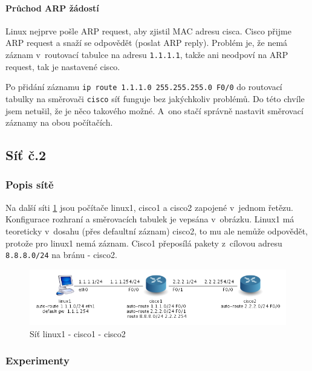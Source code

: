 \paragraph{Průchod ARP žádostí}
Linux nejprve pošle ARP request, aby zjistil MAC adresu cisca. Cisco přijme ARP request a snaží se odpovědět (poslat ARP reply). Problém je, že nemá záznam v~routovací tabulce na adresu \verb|1.1.1.1|, takže ani neodpoví na ARP request, tak  je nastavené cisco.

Po přidání záznamu \verb|ip route 1.1.1.0 255.255.255.0 F0/0| do routovací tabulky na směrovači \verb|cisco| síť funguje bez jakýchkoliv problémů. Do této chvíle jsem netušil, že je něco takového možné. A~ono stačí správně nastavit směrovací záznamy na obou počítačích.


\subsection{Síť č.2}
\subsubsection{Popis sítě}
Na další síti \ref{fig:sit_3pc} jsou počítače linux1, cisco1 a cisco2 zapojené v~jednom řetězu. Konfigurace rozhraní a směrovacích tabulek je vepsána v~obrázku. Linux1 má teoreticky v~dosahu (přes defaultní záznam) cisco2, to mu ale nemůže odpovědět, protože pro linux1 nemá záznam. Cisco1 přeposílá pakety z~cílovou adresu \verb|8.8.8.0/24| na bránu - cisco2.

\begin{figure}[h]
\begin{center}
\includegraphics[width=15cm]{figures/sit_3pc.png}
\caption{Síť linux1 - cisco1 - cisco2}
\label{fig:sit_3pc}
\end{center}
\end{figure}


\newpage

\subsubsection{Experimenty} 


